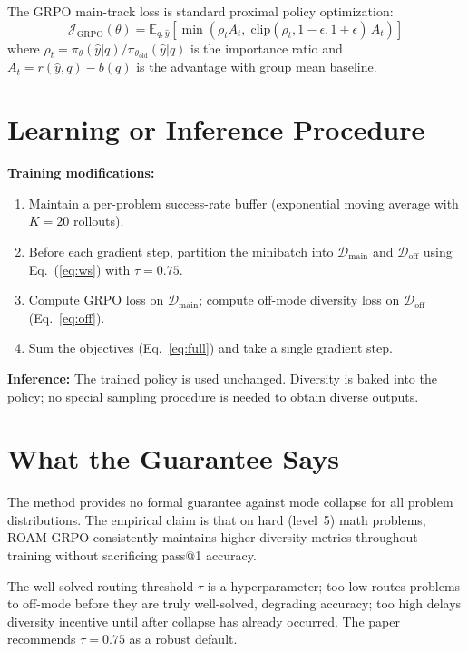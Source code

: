 \documentclass[10pt,twocolumn]{article}
\begin{document}
The GRPO main-track loss is standard proximal policy optimization:
\begin{equation}
\mathcal{J}_{\mathrm{GRPO}}(\theta) = \mathbb{E}_{q,\hat{y}}\!\left[\min\!\left(\rho_t A_t,\; \mathrm{clip}(\rho_t, 1-\epsilon, 1+\epsilon)\, A_t\right)\right]
\label{eq:grpo}
\end{equation}
where $\rho_t = \pi_\theta(\hat{y}|q)/\pi_{\theta_{\mathrm{old}}}(\hat{y}|q)$ is the importance ratio and $A_t = r(\hat{y},q) - b(q)$ is the advantage with group mean baseline.

\section{Learning or Inference Procedure}

\textbf{Training modifications:}
\begin{enumerate}[leftmargin=1.5em,itemsep=1pt]
  \item Maintain a per-problem success-rate buffer (exponential moving average with $K=20$ rollouts).
  \item Before each gradient step, partition the minibatch into $\mathcal{D}_{\mathrm{main}}$ and $\mathcal{D}_{\mathrm{off}}$ using Eq.~(\ref{eq:ws}) with $\tau = 0.75$.
  \item Compute GRPO loss on $\mathcal{D}_{\mathrm{main}}$; compute off-mode diversity loss on $\mathcal{D}_{\mathrm{off}}$ (Eq.~\ref{eq:off}).
  \item Sum the objectives (Eq.~\ref{eq:full}) and take a single gradient step.
\end{enumerate}

\textbf{Inference:} The trained policy is used unchanged.
Diversity is baked into the policy; no special sampling procedure is needed to obtain diverse outputs.

\section{What the Guarantee Says}

The method provides no formal guarantee against mode collapse for all problem distributions.
The empirical claim is that on hard (level~5) math problems, ROAM-GRPO consistently maintains higher diversity metrics throughout training without sacrificing pass@1 accuracy.

The well-solved routing threshold $\tau$ is a hyperparameter; too low routes problems to off-mode before they are truly well-solved, degrading accuracy; too high delays diversity incentive until after collapse has already occurred.
The paper recommends $\tau = 0.75$ as a robust default.
\end{document}
